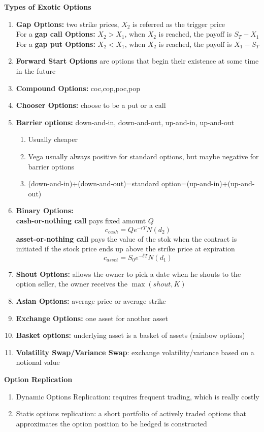 \documentclass[11pt,fleqn]{book} %
\numberwithin{equation}{section} %
\numberwithin{figure}{section} %
\numberwithin{table}{section} %
\begin{document}
\begin{definition}\textbf{Types of Exotic Options}
\begin{enumerate}
    \item \textbf{Gap Options:} two strike prices, $X_2$ is referred as the trigger price\\
    For a \textbf{gap call Options:} $X_2>X_1$, when $X_2$ is reached, the payoff is $S_T-X_1$\\
    For a \textbf{gap put Options:} $X_2<X_1$, when $X_2$ is reached, the payoff is $X_1-S_T$
    \item \textbf{Forward Start Options} are options that begin their existence at some time in the future
    \item \textbf{Compound Options:} coc,cop,poc,pop
    \item \textbf{Chooser Options:} choose to be a put or a call
    \item \textbf{Barrier options:} down-and-in, down-and-out, up-and-in, up-and-out
    \begin{enumerate}
        \item Usually cheaper
        \item Vega usually always positive for standard options, but maybe negative for barrier options
        \item (down-and-in)+(down-and-out)=standard option=(up-and-in)+(up-and-out)
    \end{enumerate}
    \item \textbf{Binary Options:}\\
    \textbf{cash-or-nothing call} pays fixed amount $Q$
    $$
    c_{cash}=Qe^{-rT}N(d_2)
    $$
    \textbf{asset-or-nothing call} pays the value of the stok when the contract is initiated if the stock price ends up above the strike price at expiration
    $$
    c_{asset}=S_0e^{-\delta T}N(d_1)
    $$
    \item \textbf{Shout Options:} allows the owner to pick a date when he shouts to the option seller, the owner receives the $\max(shout,K)$
    \item \textbf{Asian Options:} average price or average strike
    \item \textbf{Exchange Options:} one asset for another asset
    \item \textbf{Basket options:} underlying asset is a basket of assets (rainbow options)
    \item \textbf{Volatility Swap/Variance Swap}: exchange volatility/variance based on a notional value
\end{enumerate}
\end{definition}
\begin{definition}\textbf{Option Replication}
\begin{enumerate}
    \item Dynamic Options Replication: requires frequent trading, which is really costly
    \item Statis options replication: a short portfolio of actively traded options that approximates the option position to be hedged is constructed
\end{enumerate}
\end{definition}
\end{document}
